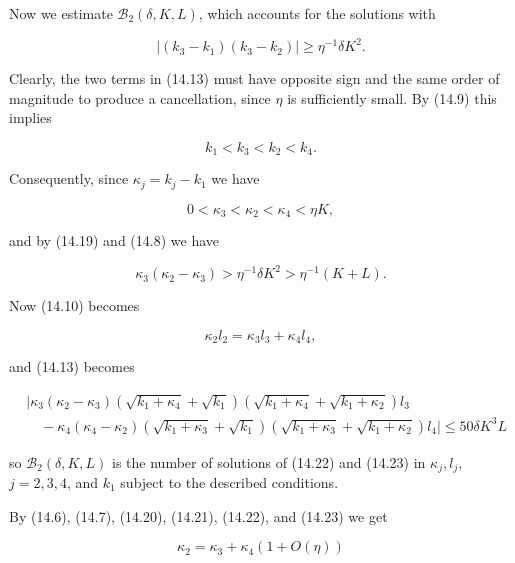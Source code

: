 \documentclass[10pt]{article}
\begin{document}
Now we estimate $\mathscr{B}_{2}(\delta, K, L)$, which accounts for the solutions with


\begin{equation*}
\left|\left(k_{3}-k_{1}\right)\left(k_{3}-k_{2}\right)\right| \geqslant \eta^{-1} \delta K^{2} . \tag{14.19}
\end{equation*}


Clearly, the two terms in (14.13) must have opposite sign and the same order of magnitude to produce a cancellation, since $\eta$ is sufficiently small. By (14.9) this implies

$$
k_{1}<k_{3}<k_{2}<k_{4} .
$$

Consequently, since $\kappa_{j}=k_{j}-k_{1}$ we have


\begin{equation*}
0<\kappa_{3}<\kappa_{2}<\kappa_{4}<\eta K, \tag{14.20}
\end{equation*}


and by (14.19) and (14.8) we have


\begin{equation*}
\kappa_{3}\left(\kappa_{2}-\kappa_{3}\right)>\eta^{-1} \delta K^{2}>\eta^{-1}(K+L) . \tag{14.21}
\end{equation*}


Now (14.10) becomes


\begin{equation*}
\kappa_{2} l_{2}=\kappa_{3} l_{3}+\kappa_{4} l_{4}, \tag{14.22}
\end{equation*}


and (14.13) becomes


\begin{align*}
& \mid \kappa_{3}\left(\kappa_{2}-\kappa_{3}\right)\left(\sqrt{k_{1}+\kappa_{4}}+\sqrt{k_{1}}\right)\left(\sqrt{k_{1}+\kappa_{4}}+\sqrt{k_{1}+\kappa_{2}}\right) l_{3} \\
& \quad-\kappa_{4}\left(\kappa_{4}-\kappa_{2}\right)\left(\sqrt{k_{1}+\kappa_{3}}+\sqrt{k_{1}}\right)\left(\sqrt{k_{1}+\kappa_{3}}+\sqrt{k_{1}+\kappa_{2}}\right) l_{4} \mid \leqslant 50 \delta K^{3} L \tag{14.23}
\end{align*}


so $\mathscr{B}_{2}(\delta, K, L)$ is the number of solutions of (14.22) and (14.23) in $\kappa_{j}, l_{j}$, $j=2,3,4$, and $k_{1}$ subject to the described conditions.

By (14.6), (14.7), (14.20), (14.21), (14.22), and (14.23) we get


\begin{equation*}
\kappa_{2}=\kappa_{3}+\kappa_{4}(1+O(\eta)) \tag{14.24}
\end{equation*}
\end{document}
